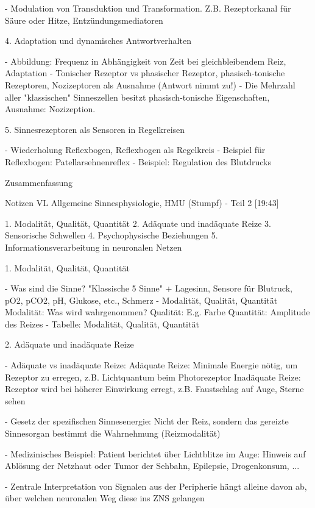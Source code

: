 - Modulation von Transduktion und Transformation. Z.B. Rezeptorkanal für Säure oder Hitze, Entzündungsmediatoren

4. Adaptation und dynamisches Antwortverhalten

- Abbildung: Frequenz in Abhängigkeit von Zeit bei gleichbleibendem Reiz, Adaptation
- Tonischer Rezeptor vs phasischer Rezeptor, phasisch-tonische Rezeptoren, Nozizeptoren als Ausnahme (Antwort nimmt zu!)
- Die Mehrzahl aller "klassischen" Sinneszellen besitzt phasisch-tonische Eigenschaften, Ausnahme: Nozizeption.


5. Sinnesrezeptoren als Sensoren in Regelkreisen

- Wiederholung Reflexbogen, Reflexbogen als Regelkreis
- Beispiel für Reflexbogen: Patellarsehnenreflex
- Beispiel: Regulation des Blutdrucks

Zusammenfassung


Notizen VL Allgemeine Sinnesphysiologie, HMU (Stumpf) - Teil 2 [19:43]

 
1. Modalität, Qualität, Quantität
2. Adäquate und inadäquate Reize
3. Sensorische Schwellen
4. Psychophysische Beziehungen
5. Informationsverarbeitung in neuronalen Netzen

1. Modalität, Qualität, Quantität

- Was sind die Sinne? "Klassische 5 Sinne" + Lagesinn, Sensore für Blutruck, pO2, pCO2, pH, Glukose, etc., Schmerz
- Modalität, Qualität, Quantität
    Modalität: Was wird wahrgenommen? 
    Qualität: E.g. Farbe
    Quantität: Amplitude des Reizes
- Tabelle: Modalität, Qualität, Quantität

2. Adäquate und inadäquate Reize

- Adäquate vs inadäquate Reize:
    Adäquate Reize: Minimale Energie nötig, um Rezeptor zu erregen, z.B. Lichtquantum beim Photorezeptor
    Inadäquate Reize: Rezeptor wird bei höherer Einwirkung erregt, z.B. Faustschlag auf Auge, Sterne sehen 

- Gesetz der spezifischen Sinnesenergie:
    Nicht der Reiz, sondern das gereizte Sinnesorgan bestimmt die Wahrnehmung (Reizmodalität)
    
- Medizinisches Beispiel: Patient berichtet über Lichtblitze im Auge: Hinweis auf Ablösung der Netzhaut oder Tumor der Sehbahn, Epilepsie, Drogenkonsum, ...
    
- Zentrale Interpretation von Signalen aus der Peripherie hängt alleine davon ab, über welchen neuronalen Weg diese ins ZNS gelangen
    


